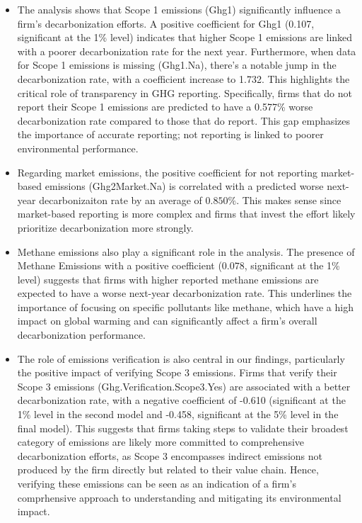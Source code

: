 \begin{itemize}
    \item The analysis shows that Scope 1 emissions (Ghg1) significantly influence a firm's decarbonization efforts. A positive coefficient for Ghg1 (0.107, significant at the 1\% level) indicates that higher Scope 1 emissions are linked with a poorer decarbonization rate for the next year. Furthermore, when data for Scope 1 emissions is missing (Ghg1.Na), there's a notable jump in the decarbonization rate, with a coefficient increase to 1.732. This highlights the critical role of transparency in GHG reporting. Specifically, firms that do not report their Scope 1 emissions are predicted to have a 0.577\% worse decarbonization rate compared to those that do report. This gap emphasizes the importance of accurate reporting; not reporting is linked to poorer environmental performance.

    \item Regarding market emissions, the positive coefficient for not reporting market-based emissions (Ghg2Market.Na) is correlated with a predicted worse next-year decarbonizaiton rate by an average of $0.850 \%$. This makes sense since market-based reporting is more complex and firms that invest the effort likely prioritize decarbonization more strongly. 
    
    \item Methane emissions also play a significant role in the analysis. The presence of Methane Emissions with a positive coefficient ($0.078$, significant at the 1\% level) suggests that firms with higher reported methane emissions are expected to have a worse next-year decarbonization rate. This underlines the importance of focusing on specific pollutants like methane, which have a high impact on global warming and can significantly affect a firm's overall decarbonization performance.
    \item The role of emissions verification is also central in our findings, particularly the positive impact of verifying Scope 3 emissions. Firms that verify their Scope 3 emissions (Ghg.Verification.Scope3.Yes) are associated with a better decarbonization rate, with a negative coefficient of -0.610 (significant at the 1\% level in the second model and -0.458, significant at the 5\% level in the final model). This suggests that firms taking steps to validate their broadest category of emissions are likely more committed to comprehensive decarbonization efforts, as Scope 3 encompasses indirect emissions not produced by the firm directly but related to their value chain. Hence, verifying these emissions can be seen as an indication of a firm's comprhensive approach to understanding and mitigating its environmental impact.


\end{itemize}
